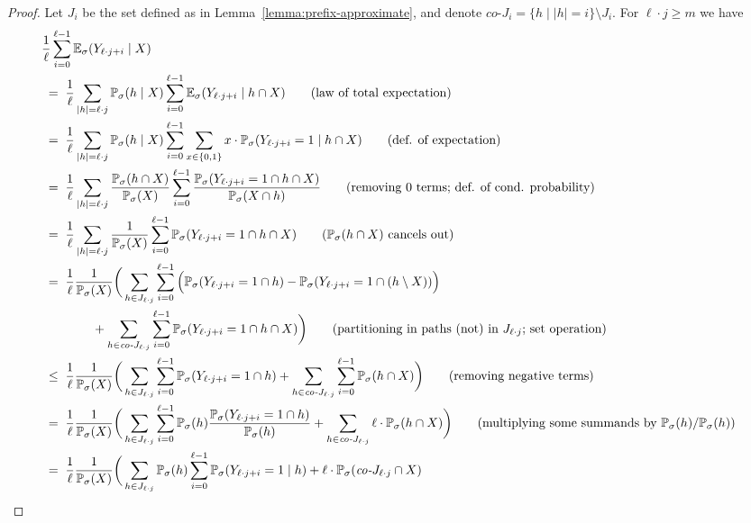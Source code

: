 \documentclass[a4paper,UKenglish]{lipics}
\newcommand{\Ex}[3][]{\ifblank{#1}{\mathbb{E}_{#2}}{\mathbb{E}^{#1}_{#2}}(#3)}
\renewcommand{\Pr}[3][]{\ifblank{#1}{\mathbb{P}_{#2}}{\mathbb{P}^{#1}_{#2}}(#3)}
\newcommand{\compl}[1]{\textit{co-}#1}
\begin{document}
\begin{proof}
	Let $J_i$ be the set defined as in Lemma~\ref{lemma:prefix-approximate}, and denote $\compl{J_i} = \{h \mid |h| = i\} \setminus J_i$.
	For $\ell\cdot j \ge m$ we have
	\begin{align*}
	\lefteqn{\frac{1}{\ell} \sum_{i=0}^{\ell-1} \Ex{\sigma}{Y_{\ell\cdot j + i} \mid X}}\\
	& \; = \;
	\frac{1}{\ell} \sum_{|h| = \ell\cdot j} \Pr\sigma{h \mid X} \sum_{i=0}^{\ell-1} \Ex{\sigma}{Y_{\ell\cdot j + i}\mid h\cap X}\tag{law of total expectation}\\
	& \; = \;
	\frac{1}{\ell}\sum_{|h| = \ell\cdot j} \Pr\sigma{h \mid X} \sum_{i=0}^{\ell-1} \sum_{x\in \{0,1\}} x \cdot \Pr{\sigma}{Y_{\ell\cdot j + i} = 1 \mid h \cap X}\tag{def. of expectation}\\
	& \; = \;
	\frac{1}{\ell}\sum_{|h| = \ell\cdot j} \frac{\Pr\sigma{h \cap X}}{\Pr\sigma{X}} \sum_{i=0}^{\ell-1}  \frac{\Pr{\sigma}{Y_{\ell\cdot j + i} = 1 \cap h \cap X}}{\Pr{\sigma}{X\cap h}}\tag{removing $0$ terms; def. of cond. probability}\\
	& \; = \;
	\frac{1}{\ell} \sum_{|h| = \ell\cdot j} \frac{1}{\Pr\sigma{X}} \sum_{i=0}^{\ell-1} \Pr{\sigma}{Y_{\ell\cdot j + i} = 1 \cap h \cap X}\tag{$\Pr\sigma{h \cap X}$ cancels out}\\
	& \; = \;
	\frac{1}{\ell}  \frac{1}{\Pr\sigma{X}}\bigg( \sum_{h \in J_{\ell\cdot j}}\sum_{i=0}^{\ell-1} \Big(\Pr{\sigma}{Y_{\ell\cdot j + i} = 1 \cap h} - \Pr{\sigma}{Y_{\ell\cdot j + i} = 1 \cap (h\setminus X)}\Big)\\
	& \qquad \qquad + \sum_{h \in \compl{J_{\ell\cdot j}}}\sum_{i=0}^{\ell-1} \Pr{\sigma}{Y_{\ell\cdot j + i} = 1 \cap h \cap X}\bigg)\tag{partitioning in paths (not) in $J_{\ell\cdot j}$; set operation}\\
	& \; \le \;
	\frac{1}{\ell} \frac{1}{\Pr\sigma{X}} \bigg( \sum_{h \in J_{\ell\cdot j}}\sum_{i=0}^{\ell-1} \Pr{\sigma}{Y_{\ell\cdot j + i} = 1 \cap h} + \sum_{h \in \compl{J_{\ell\cdot j}}}\sum_{i=0}^{\ell-1} \Pr{\sigma}{h \cap X}\bigg)
       \tag{removing negative terms}\\
	& \; = \;
	\frac{1}{\ell}\frac{1}{\Pr\sigma{X}}\bigg(\sum_{h \in J_{\ell\cdot j}} \sum_{i=0}^{\ell-1}  \Pr\sigma{h} \frac{\Pr{\sigma}{Y_{\ell\cdot j + i} = 1 \cap h}}{\Pr\sigma{h}} + \sum_{h \in \compl{J_{\ell\cdot j}}}\ell\cdot  \Pr{\sigma}{h \cap X}\bigg)\tag{multiplying some summands by $\Pr\sigma{h}/\Pr\sigma{h}$}\\
	& \; = \;
	\frac{1}{\ell} \frac{1}{\Pr\sigma{X}}\bigg(\sum_{h \in J_{\ell\cdot j}} \Pr\sigma{h} \sum_{i=0}^{\ell-1}\Pr{\sigma}{Y_{\ell\cdot j + i} = 1 \mid h} + \ell \cdot \Pr{\sigma}{\compl{J_{\ell\cdot j}} \cap X}

\end{align*}
\end{proof}
\end{document}
